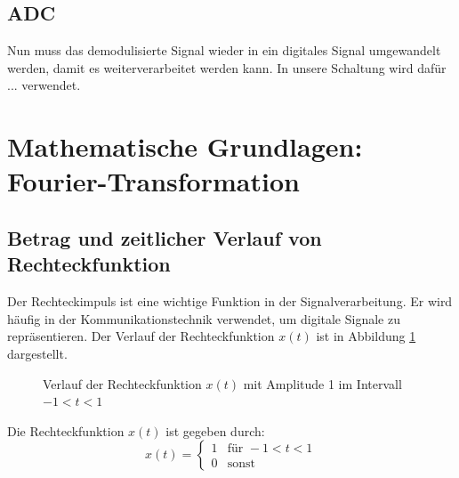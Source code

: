 \subsection{ADC}
Nun muss das demodulisierte Signal wieder in ein digitales Signal umgewandelt werden, damit es weiterverarbeitet werden kann.
In unsere Schaltung wird dafür ... verwendet. 


\section{Mathematische Grundlagen: Fourier-Transformation}
\subsection{Betrag und zeitlicher Verlauf von Rechteckfunktion}
Der Rechteckimpuls ist eine wichtige Funktion in der Signalverarbeitung.
Er wird häufig in der Kommunikationstechnik verwendet, um digitale Signale zu repräsentieren.
Der Verlauf der Rechteckfunktion $x(t)$ ist in Abbildung \ref{fig:rechteck} dargestellt.
\begin{figure}[H]
    \centering
    \caption{Verlauf der Rechteckfunktion $x(t)$ mit Amplitude 1 im Intervall $-1 < t < 1$}
    \label{fig:rechteck}
\end{figure}

Die Rechteckfunktion $x(t)$ ist gegeben durch:
\[
x(t) = \begin{cases}
    1 & \text{für } -1 < t < 1 \\
    0 & \text{sonst}
    \end{cases}
\]
    
